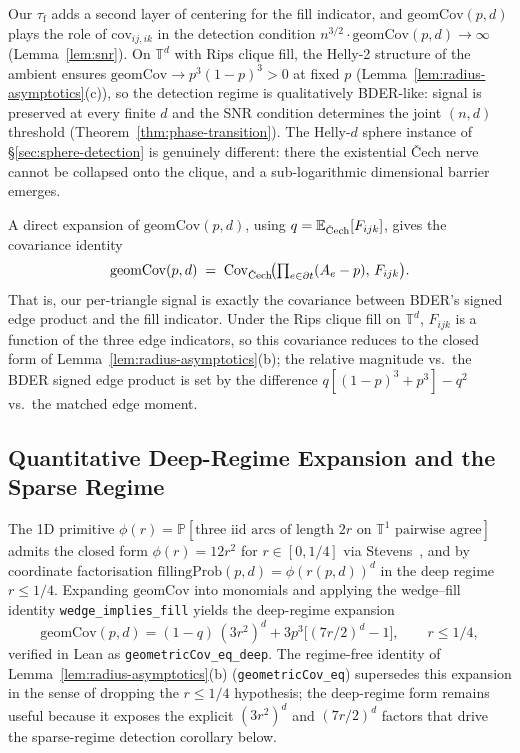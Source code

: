 \documentclass[reqno,12pt]{amsart}
\newcommand{\tauf}{\tau_{\mathrm{f}}}
\newcommand{\Cech}{\ifmmode\text{\v{C}ech}\else\v{C}ech\fi}  %
\newcommand{\geomCov}{\mathrm{geomCov}}
\newcommand{\fillingP}{\mathrm{fillingProb}}
\newcommand{\TT}{\mathbb{T}}         %
\newcommand{\EE}{\mathbb{E}}
\newcommand{\PP}{\mathbb{P}}
\newcommand{\lean}[1]{\textup{\texttt{\small #1}}}
\theoremstyle{plain}
\theoremstyle{definition}
\theoremstyle{remark}
\begin{document}
Our $\tauf$ adds a second layer of centering for the fill indicator, and $\geomCov(p,d)$
plays the role of $\mathrm{cov}_{ij,ik}$ in the detection condition
$n^{3/2}\cdot\geomCov(p,d)\to\infty$ (Lemma~\ref{lem:snr}). On $\TT^d$ with Rips clique
fill, the Helly-2 structure of the ambient ensures $\geomCov \to p^3(1-p)^3 > 0$ at fixed
$p$ (Lemma~\ref{lem:radius-asymptotics}(c)), so the detection regime is qualitatively
BDER-like: signal is preserved at every finite $d$ and the SNR condition determines
the joint $(n, d)$ threshold (Theorem~\ref{thm:phase-transition}). The Helly-$d$ sphere
instance of \S\ref{sec:sphere-detection} is genuinely different: there the existential
\v{C}ech nerve cannot be collapsed onto the clique, and a sub-logarithmic dimensional
barrier emerges.

A direct expansion of $\geomCov(p,d)$, using $q = \EE_{\Cech}[F_{ijk}]$, gives the
covariance identity
\begin{equation}\label{eq:geomcov-as-covariance}
  \geomCov(p,d) \;=\; \mathrm{Cov}_{\Cech}\!\bigl(\textstyle\prod_{e\in\partial t}(A_e - p),\, F_{ijk}\bigr).
\end{equation}
That is, our per-triangle signal is exactly the covariance between BDER's signed edge
product and the fill indicator. Under the Rips clique fill on $\TT^d$, $F_{ijk}$ is a
function of the three edge indicators, so this covariance reduces to the closed form of
Lemma~\ref{lem:radius-asymptotics}(b); the relative magnitude vs.\ the BDER signed edge
product is set by the difference $q[(1-p)^3 + p^3] - q^2$ vs.\ the matched edge moment.

\subsection{Quantitative Deep-Regime Expansion and the Sparse Regime}\label{sec:quantitative}

The 1D primitive $\phi(r) = \PP[\text{three iid arcs of length }2r\text{ on }\TT^1\text{ pairwise
agree}]$ admits the closed form $\phi(r) = 12 r^2$ for $r \in [0, 1/4]$ via
Stevens~\cite{Stevens1939}, and by coordinate factorisation
$\fillingP(p, d) = \phi(r(p, d))^d$ in the deep regime $r \le 1/4$.
Expanding $\geomCov$ into monomials and applying the wedge--fill identity
\lean{wedge\_implies\_fill} yields the deep-regime expansion
\begin{equation}\label{eq:geomcov-deep}
  \geomCov(p,d) = (1-q)\,(3r^2)^d + 3p^3\bigl[(7r/2)^d - 1\bigr], \qquad r \leq 1/4,
\end{equation}
verified in Lean as \lean{geometricCov\_eq\_deep}. The regime-free identity of
Lemma~\ref{lem:radius-asymptotics}(b) (\lean{geometricCov\_eq}) supersedes this expansion
in the sense of dropping the $r \le 1/4$ hypothesis; the deep-regime form remains useful
because it exposes the explicit $(3r^2)^d$ and $(7r/2)^d$ factors that drive the
sparse-regime detection corollary below.
\end{document}
